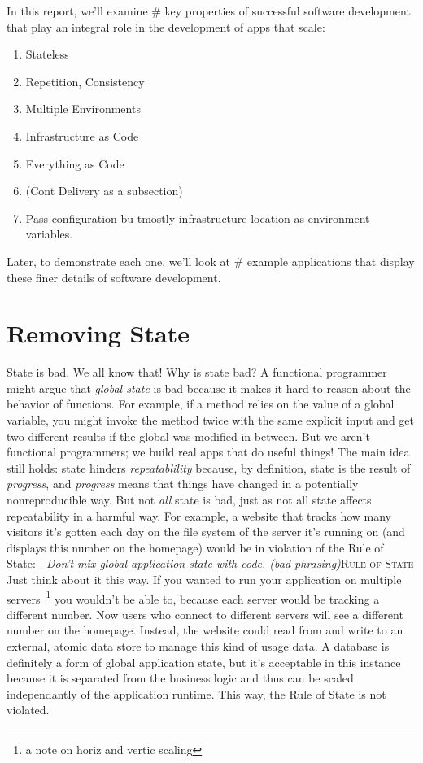 \documentclass{article}
\newcommand{\term}[1]{\textit{#1}}
\newcommand{\newp}{\newline\indent}
\newcommand{\imp}[2]{\newp| \textit{#2}\newp \textsc{#1}}
\begin{document}
In this report, we'll examine \# key properties of successful software development that play an integral role in the development of apps that scale:

\begin{enumerate}
  \item Stateless
  \item Repetition, Consistency
  \item Multiple Environments
  \item Infrastructure as Code
  \item Everything as Code
  \item (Cont Delivery as a subsection)
  \item Pass configuration bu tmostly infrastructure location as environment variables.
\end{enumerate}
Later, to demonstrate each one, we'll look at \# example applications that display these finer details of software development.

\section{Removing State}

State is bad.
We all know that!
Why is state bad?
A functional programmer might argue that \textit{global state} is bad because it makes it hard to reason about the behavior of functions.
For example, if a method relies on the value of a global variable, you might invoke the method twice with the same explicit input and get two different results if the global was modified in between.
\newp But we aren't functional programmers; we build real apps that do useful things!
The main idea still holds: state hinders \term{repeatablility} because, by definition, state is the result of \term{progress}, and \term{progress} means that things have changed in a potentially nonreproducible way.
But not \textit{all} state is bad, just as not all state affects repeatability in a harmful way.
\newp For example, a website that tracks how many visitors it's gotten each day on the file system of the server it's running on (and displays this number on the homepage) would be in violation of the Rule of State:
\imp{Rule of State}{Don't mix global application state with code. (bad phrasing)}
\newp Just think about it this way.
If you wanted to run your application on multiple servers~\footnote{a note on horiz and vertic scaling} you wouldn't be able to, because each server would be tracking a different number.
Now users who connect to different servers will see a different number on the homepage.
Instead, the website could read from and write to an external, atomic data store to manage this kind of usage data.
A database is definitely a form of global application state, but it's acceptable in this instance because it is separated from the business logic and thus can be scaled independantly of the application runtime.
This way, the Rule of State is not violated.
\end{document}
